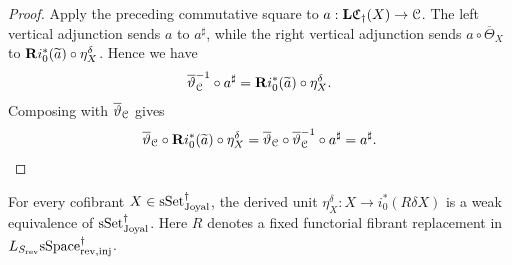 \documentclass[a4paper,dvipdfmx,11pt]{amsart}
\begin{document}
\begin{proof}
  Apply the preceding commutative square to $a:\mathbf{L}\mathfrak{C}_{\dag}(X) \to \mathcal{C}$.
  The left vertical adjunction sends $a$ to $a^{\sharp}$, while the right vertical adjunction sends $a\circ\overline\Theta_X$ to $\mathbf{R} i_0^*(\widetilde a)\circ\eta_X^{\delta}$.
  Hence we have
  \begin{align}
    \overline\vartheta_{\mathcal{C}}^{-1}
    \circ
    a^{\sharp}
    =
    \mathbf{R} i_0^*(\widetilde a)
    \circ
    \eta_X^{\delta}.
  \end{align}
  Composing with $\overline\vartheta_{\mathcal{C}}$ gives
  \begin{align}
    \overline\vartheta_{\mathcal{C}}
    \circ
    \mathbf{R} i_0^*(\widetilde a)
    \circ
    \eta_X^{\delta}
    =
    \overline\vartheta_{\mathcal{C}}
    \circ
    \overline\vartheta_{\mathcal{C}}^{-1}
    \circ
    a^{\sharp}
    =
    a^{\sharp}.
  \end{align}
\end{proof}

\begin{proposition}\label{jt.lem.unit}
  For every cofibrant $X\in\mathrm{sSet}^{\dag}_{\mathrm{Joyal}}$, the derived unit $\eta_X^{\delta} : X\to i_{0}^{*}(R\delta X)$ is a weak equivalence of $\mathrm{sSet}^{\dag}_{\mathrm{Joyal}}$.
  Here $R$ denotes a fixed functorial fibrant replacement in $L_{S_{\mathrm{rev}}}\mathrm{sSpace}^{\dag}_{\mathrm{rev},\mathrm{inj}}$.
\end{proposition}
\end{document}
